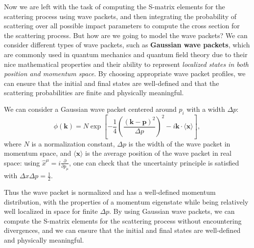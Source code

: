 Now we are left with the task of computing the S-matrix elements for the scattering process using wave packets, and then integrating the probability of scattering over all possible impact parameters to compute the cross section for the scattering process. But how are we going to model the wave packets? We can consider different types of wave packets, such as \textbf{Gaussian wave packets}, which are commonly used in quantum mechanics and quantum field theory due to their nice mathematical properties and their ability to represent \textit{localized states in both position and momentum space}. By choosing appropriate wave packet profiles, we can ensure that the initial and final states are well-defined and that the scattering probabilities are finite and physically meaningful.

\begin{example}
    We can consider a Gaussian wave packet centered around \(p_i\) with a width \(\Delta p\):
    \begin{equation}
        \phi (\mathbf{k}) = N \exp[ -\frac{1}{4} \left(\frac{(\mathbf{k} - \mathbf{p})^2}{\Delta p}\right)^2 -i \mathbf{k} \cdot \langle \mathbf{x} \rangle],
        \label{eq:gaussian_wave_packet}
    \end{equation}
    where \(N\) is a normalization constant, \(\Delta p\) is the width of the wave packet in momentum space, and \(\langle \mathbf{x} \rangle\) is the average position of the wave packet in real space: using \(\hat{x}^{\mu} = i \frac{\partial}{\partial p_\mu}\), one can check that the uncertainty principle is satisfied with \(\Delta x \Delta p = \tfrac{1}{2}\).

    Thus the wave packet is normalized and has a well-defined momentum distribution, with the properties of a momentum eigenstate while being relatively well localized in space for finite \(\Delta p\). By using Gaussian wave packets, we can compute the S-matrix elements for the scattering process without encountering divergences, and we can ensure that the initial and final states are well-defined and physically meaningful.

\end{example}

